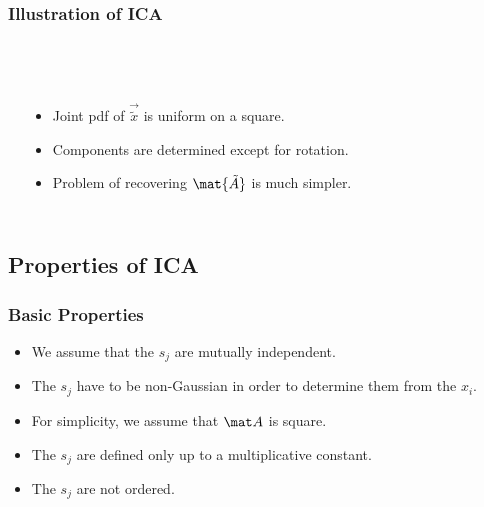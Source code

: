 \begin{frame}
  \frametitle{Illustration of ICA \cont}

   \\[.5cm]

  \begin{columns}
      \vspace*{-0.7cm}
      \begin{center}
        \resizebox{.9\linewidth}{!}{
          
        }
      \end{center}
%
      \pause 
      \begin{itemize}
        \item Joint pdf of $\vec{\tilde x}$ is uniform on a square. \pause
        \item Components are determined except for rotation. \pause
        \item Problem of recovering $\mat{\tilde A}$ is much simpler.
      \end{itemize}
   \end{columns}
\end{frame}


\subsection{Properties of ICA}

\begin{frame}
  \frametitle{Basic Properties}


  \begin{itemize}
    \item We assume that the $s_j$ are mutually independent. \pause
    \item The $s_j$ have to be non-Gaussian in order to determine them from the $x_i$. \pause
    \item For simplicity, we assume that $\mat A$ is square.
  \end{itemize}
  \pspread

  
  \begin{itemize} 
    \item The $s_j$ are defined only up to a multiplicative constant.
    \item The $s_j$ are not ordered.
  \end{itemize}
\end{frame}


